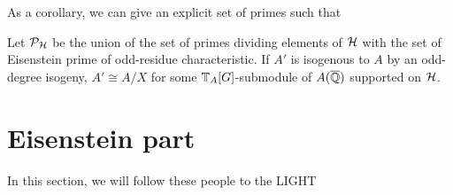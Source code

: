 \documentclass[thesis.tex]{subfiles}
\begin{document}
As a corollary, we can give an explicit set of primes such that %
\begin{corollary}
    Let $\mathcal{P}_{\mathcal{H}}$ be the union of the set of primes dividing elements of $\mathcal{H}$ with
    the set of Eisenstein prime of odd-residue characteristic. If $A'$ is
    isogenous to $A$ by an odd-degree isogeny, $A'\cong A/X$ for some
    $\mathbb{T}_A[G]$-submodule of $A(\overline{\mathbb{Q}})$ supported on $\mathcal{H}$.
\end{corollary}

\section{Eisenstein part}%
\label{sec:eisenstein_part}

In this section, we will follow these people to the LIGHT %
\end{document}
